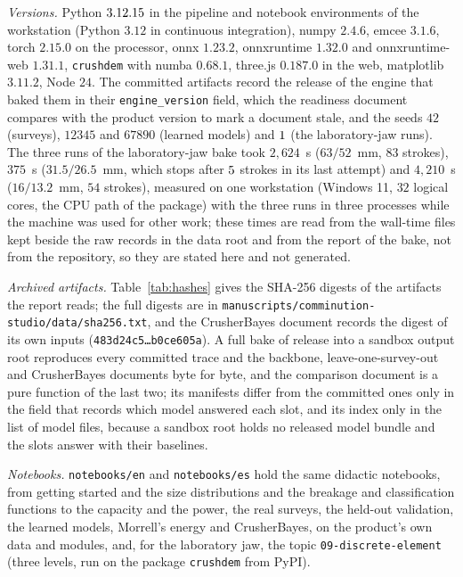 \emph{Versions.} Python $3.12.15$ in the pipeline and notebook environments of the workstation (Python $3.12$ in continuous integration), numpy $2.4.6$,
emcee $3.1.6$, torch $2.15.0$ on the processor, onnx $1.23.2$, onnxruntime $1.32.0$ and onnxruntime-web $1.31.1$, \texttt{crushdem} \demPackageVersion{} with numba $0.68.1$, three.js $0.187.0$ in the web, matplotlib $3.11.2$, Node $24$. The
committed artifacts record the release of the engine that baked them in their \texttt{engine\_version} field, which the readiness document compares with
the product version to mark a document stale, and the seeds $42$ (surveys), $12345$ and $67890$ (learned models) and $1$ (the laboratory-jaw runs). The three runs of the laboratory-jaw bake took $2{,}624$~s ($63/52$~mm, $83$ strokes), $375$~s ($31.5/26.5$~mm, which stops after $5$ strokes in its last attempt) and $4{,}210$~s ($16/13.2$~mm, $54$ strokes), measured on one workstation (Windows 11, $32$ logical cores, the CPU path of the package) with the three runs in three processes while the machine was used for other work; these times are read from the wall-time files kept beside the raw records in the data root and from the report of the bake, not from the repository, so they are stated here and not generated.

\emph{Archived artifacts.} Table~\ref{tab:hashes} gives the SHA-256 digests of the artifacts the report reads; the full digests are in
\texttt{manuscripts/\allowbreak{}comminution-studio/\allowbreak{}data/\allowbreak{}sha256.txt}, and the CrusherBayes document records the digest of its own inputs
(\texttt{483d24c5\ldots b0ce605a}). A full bake of release \docrelease{} into a sandbox output root reproduces every committed trace and the backbone,
leave-one-survey-out and CrusherBayes documents byte for byte, and the comparison document is a pure function of the last two; its manifests differ from the committed ones only in the field that records which model answered each slot, and
its index only in the list of model files, because a sandbox root holds no released model bundle and the slots answer with their baselines.

\emph{Notebooks.} \texttt{notebooks/\allowbreak{}en} and \texttt{notebooks/\allowbreak{}es} hold the same didactic notebooks, from getting started and the size distributions and the breakage and
classification functions to the capacity and the power, the real surveys, the held-out validation, the learned models, Morrell's energy and CrusherBayes,
on the product's own data and modules, and, for the laboratory jaw, the topic \texttt{09-discrete-element} (three levels, run on the package \texttt{crushdem} from PyPI).

